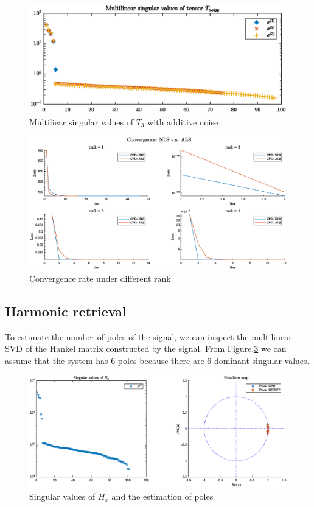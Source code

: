 \documentclass[pagesize,english,DIV=calc,footinclude=false
]{scrartcl}
\begin{document}
\begin{figure}[htbp]
  \centering
  \includegraphics[width=0.8\linewidth]{tensor_mlsvd.eps}
  \caption{Multiliear singular values of $T_3$ with additive noise}
  \label{fig:tensor_mlsvd}
\end{figure}

\begin{figure}[htbp]
  \centering
  \includegraphics[width=\linewidth]{CPD_tensor_noisy.eps}
  \caption{Convergence rate under different rank}
  \label{fig:cpd_tensor}
\end{figure}


\subsection{Harmonic retrieval}

To estimate the number of poles of the signal, we can inspect the multilinear SVD of the Hankel matrix constructed by the signal. From Figure.\ref{fig:svd_hankel} we can assume that the system has 6 poles because there are 6 dominant singular values.

\begin{figure}[htbp]
  \centering
  \includegraphics[width=\linewidth]{svd_hankel.eps}
  \caption{Singular values of $H_x$ and the estimation of poles}
  \label{fig:svd_hankel}
\end{figure}
\end{document}

